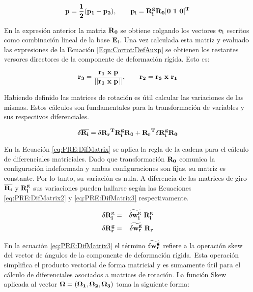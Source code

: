 \begin{equation}\label{Eqn:Corrot:DefAuxp}
	\bf{p}=\frac{1}{2}(\bf{p}_1+\bf{p}_2),~~~~~~\bf{p_i}=\bf{R}_i^g\bf{R}_0[0~1~0]^T
\end{equation}

En la expresión anterior la matriz $\bf{R}_0$ se obtiene colgando los vectores $\bf{e}_i$ escritos como combinación lineal de la base $\bf{E_i}$. Una vez calculada esta matriz y evaluado las expresiones de la Ecuación \eqref{Eqn:Corrot:DefAuxp} se obtienen los restantes versores directores
de la componente de deformación rígida. Esto es:


\begin{equation}\label{Eqn:Corrot:VectorsR}
	\bf{r}_3=\frac{\bf{r_1}~x~\bf{p}}{||\bf{r_1}~x~\bf{p}||},~~~~~~\bf{r_2}=\bf{r_3}~x~\bf{r_1}
\end{equation}


Habiendo definido las matrices de rotación  es útil calcular las variaciones de las mismas. Estos cálculos son fundamentales para la transformación de variables y sus respectivos diferenciales.

\begin{equation}\label{eq:PRE:DifMatrix}
	\delta \overline{\bf{R_i}}=\delta\bf{R_r}^T\bf{R_i^g}\bf{R_0}+\bf{R_r}^T\delta \bf{R_i^g}\bf{R_0}
\end{equation}

En la Ecuación \eqref{eq:PRE:DifMatrix} se aplica la regla de la cadena para el cálculo de diferenciales matriciales. Dado que transformación $\bf{R_0}$ comunica la configuración indeformada y ambas configuraciones son fijas, su matriz es constante. Por lo tanto, su variación es nula. A diferencia de las matrices de giro $\overline{\bf{R_i}}$ y $ \bf{R_i^g}$ sus variaciones pueden hallarse según las Ecuaciones \eqref{eq:PRE:DifMatrix2} y \eqref{eq:PRE:DifMatrix3} respectivamente.


\begin{eqnarray}
	\label{eq:PRE:DifMatrix2}
	\delta \bf{R_i^g} &=& \widetilde{\delta\bf{w}_i^g}~\bf{R}_i^g\\
	\label{eq:PRE:DifMatrix3}
	\delta \bf{R_r^g} &=& \widetilde{\delta\bf{w}_r^g}~\bf{R}_r
\end{eqnarray}

En la ecuación \eqref{eq:PRE:DifMatrix3} el término $\widetilde{\delta\bf{w}_r^g}$ refiere a la operación skew del vector de ángulos de la componente de deformación rígida. Esta operación simplifica el producto vectorial de forma matricial y es sumamente útil para el cálculo de diferenciales asociados a matrices de rotación. La función \gls{Skew} aplicada al vector $\bf{\Omega}=(\Omega_1,\Omega_2,\Omega_3)$ toma la siguiente forma:


